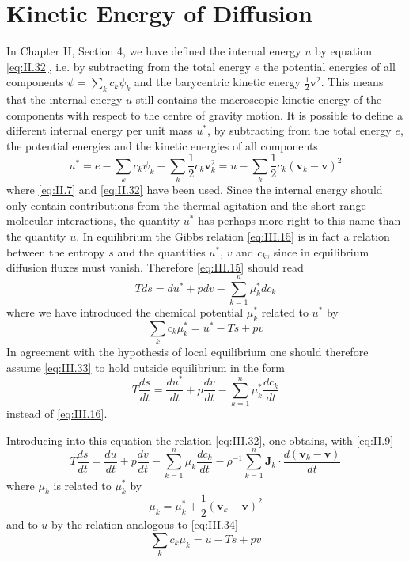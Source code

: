 \section{Kinetic Energy of Diffusion}
In Chapter II, Section 4, we have defined the internal energy $u$ by equation \eqref{eq:II.32}, i.e. by subtracting from the total energy $e$ the potential energies of all components $\psi = \sum_k c_k \psi_k$ and the barycentric kinetic energy $\frac{1}{2} \bm{v}^2$. This means that the internal energy $u$ still contains the macroscopic
kinetic energy of the components with respect to the centre of gravity
motion. It is possible to define a different internal energy per unit
mass $u^*$, by subtracting from the total energy $e$, the potential energies and the kinetic energies of all components
\begin{equation}
u^* = e - \sum_k c_k \psi_k - \sum_k \frac{1}{2} c_k \bm{v}_k^2 = u - \sum_k \frac{1}{2} c_k (\bm{v}_k - \bm{v})^2
    \label{eq:III.32}
\end{equation}
where \eqref{eq:II.7} and \eqref{eq:II.32} have been used. Since the internal energy should only contain contributions from the thermal agitation and the short-range molecular interactions, the quantity $u^*$ has perhaps more right to this name than the quantity $u$. In equilibrium the Gibbs relation \eqref{eq:III.15} is in fact a relation between the entropy $s$ and the quantities $u^*$, $v$ and $c_k$, since in equilibrium diffusion fluxes must vanish. Therefore \eqref{eq:III.15} should read
\begin{equation}
T ds = du^* + pdv - \sum_{k=1}^n \mu_k^* d c_k
    \label{eq:III.33}
\end{equation}
where we have introduced the chemical potential $\mu_k^*$ related to $u^*$ by
\begin{equation}
\sum_k c_k \mu_k^* = u^* - Ts + pv
    \label{eq:III.34}
\end{equation}
In agreement with the hypothesis of local equilibrium one should
therefore assume \eqref{eq:III.33} to hold outside equilibrium in the form
\begin{equation}
T \frac{d s}{d t} = \frac{d u^*}{d t} + p \frac{d v}{d t} - \sum_{k=1}^n \mu_k^* \frac{d c_k}{d t}
    \label{eq:III.35}
\end{equation}
instead of \eqref{eq:III.16}.

Introducing into this equation the relation \eqref{eq:III.32}, one obtains, with \eqref{eq:II.9}
\begin{equation}
T \frac{d s}{d t} = \frac{d u}{d t} + p \frac{d v}{d t} - \sum_{k=1}^n \mu_k \frac{d c_k}{d t} - \rho^{-1} \sum_{k=1}^n \bm{J}_k \cdot \frac{d (\bm{v}_k - \bm{v})}{dt}
    \label{eq:III.36}
\end{equation}
where $\mu_k$ is related to $\mu_k^*$ by
\begin{equation}
\mu_k = \mu_k^* + \frac{1}{2} (\bm{v}_k - \bm{v})^2
    \label{eq:III.37}
\end{equation}
and to $u$ by the relation analogous to \eqref{eq:III.34}
\begin{equation}
\sum_k c_k \mu_k = u - Ts + pv
    \label{eq:III.38}
\end{equation}

